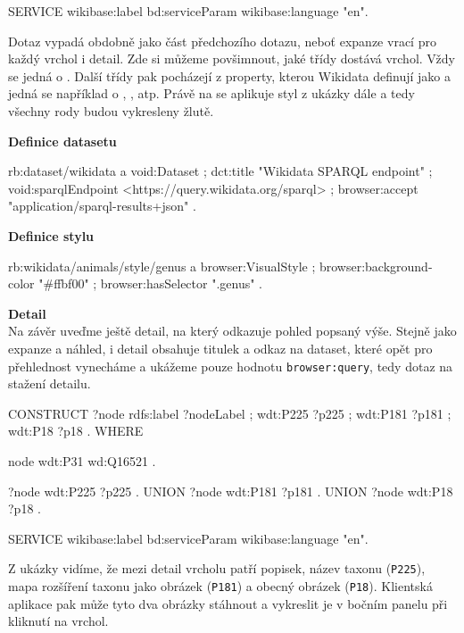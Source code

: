 \begin{prikl}
\begin{code}
{    SERVICE wikibase:label { bd:serviceParam wikibase:language "en". }
}
\end{code}
Dotaz vypadá obdobně jako část předchozího dotazu, neboť expanze vrací pro každý vrchol i detail. Zde si můžeme povšimnout, jaké třídy dostává vrchol. Vždy se jedná o . Další třídy pak pocházejí z property, kterou Wikidata definují jako  a jedná se například o , ,  atp. Právě na  se aplikuje styl z ukázky dále a tedy všechny rody budou vykresleny žlutě.

\medskip

\textbf{Definice datasetu}
\begin{code}
rb:dataset/wikidata a void:Dataset ;
    dct:title "Wikidata SPARQL endpoint" ;
    void:sparqlEndpoint <https://query.wikidata.org/sparql> ;
    browser:accept "application/sparql-results+json" .
\end{code}

\textbf{Definice stylu}
\begin{code}
rb:wikidata/animals/style/genus a browser:VisualStyle ;
    browser:background-color "#ffbf00" ;
    browser:hasSelector ".genus" .
\end{code}

\newpage

\textbf{Detail} \\
Na závěr uveďme ještě detail, na který odkazuje pohled popsaný výše. Stejně jako expanze a náhled, i detail obsahuje titulek a odkaz na dataset, které opět pro přehlednost vynecháme a ukážeme pouze hodnotu \texttt{browser:query}, tedy dotaz na stažení detailu.
\begin{code}
CONSTRUCT {
    ?node rdfs:label ?nodeLabel ;
          wdt:P225 ?p225 ;
          wdt:P181 ?p181 ;
          wdt:P18 ?p18 .
} WHERE {
    node wdt:P31 wd:Q16521 .

    {
        ?node wdt:P225 ?p225 .
    } UNION {
        ?node wdt:P181 ?p181 .
    } UNION {
        ?node wdt:P18 ?p18 .
    }

    SERVICE wikibase:label { bd:serviceParam wikibase:language "en". }
}
\end{code}

Z ukázky vidíme, že mezi detail vrcholu patří popisek, název taxonu (\texttt{P225}), mapa rozšíření taxonu jako obrázek (\texttt{P181}) a obecný obrázek (\texttt{P18}). Klientská aplikace pak může tyto dva obrázky stáhnout a vykreslit je v bočním panelu při kliknutí na vrchol.
\end{prikl}

